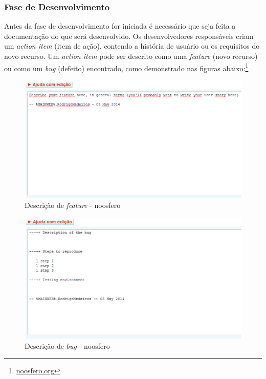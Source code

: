 \subsubsection{Fase de Desenvolvimento}
%
Antes da fase de desenvolvimento for iniciada é necessário que seja feita a 
documentação do que será desenvolvido. Os desenvolvedores responsáveis criam um 
\textit{action item} (item de ação), contendo a história de usuário ou os requisitos do novo 
recurso. Um \textit{action item} pode ser descrito como uma \textit{feature} (novo recurso) ou como 
um \textit{bug} (defeito) encontrado, como demonstrado nas figuras abaixo:\footnote{\url{noosfero.org}}
%
\begin{figure}[!h]
    \centering
    \includegraphics[keepaspectratio=true,scale=0.65]
      {figuras/noosfero_feature.eps}
    \caption{Descrição de \textit{feature} - noosfero}
    \label{noosfero_feature}
\end{figure}
%
\begin{figure}[!h]
    \centering
    \includegraphics[keepaspectratio=true,scale=0.65]
      {figuras/noosfero_bug.eps}
    \caption{Descrição de \textit{bug} - noosfero}
    \label{noosfero_bug}
\end{figure}

